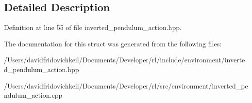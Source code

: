 \subsection{Detailed Description}


Definition at line 55 of file inverted\+\_\+pendulum\+\_\+action.\+hpp.



The documentation for this struct was generated from the following files\+:\begin{DoxyCompactItemize}
\item 
/\+Users/davidfridovichkeil/\+Documents/\+Developer/rl/include/environment/inverted\+\_\+pendulum\+\_\+action.\+hpp\item 
/\+Users/davidfridovichkeil/\+Documents/\+Developer/rl/src/environment/inverted\+\_\+pendulum\+\_\+action.\+cpp\end{DoxyCompactItemize}
